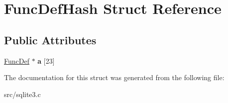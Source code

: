 \hypertarget{struct_func_def_hash}{\section{Func\-Def\-Hash Struct Reference}
\label{struct_func_def_hash}
}
\subsection*{Public Attributes}
\begin{DoxyCompactItemize}
\item 
\hypertarget{struct_func_def_hash_a3e044ccfe432770ef7297e86e405cc96}{\hyperlink{struct_func_def}{Func\-Def} $\ast$ {\bfseries a} \mbox{[}23\mbox{]}}\label{struct_func_def_hash_a3e044ccfe432770ef7297e86e405cc96}

\end{DoxyCompactItemize}


The documentation for this struct was generated from the following file\-:\begin{DoxyCompactItemize}
\item 
src/sqlite3.\-c\end{DoxyCompactItemize}

